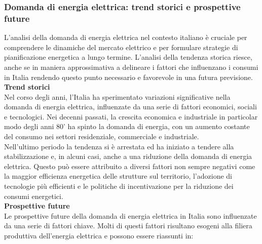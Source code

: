 \documentclass{article}
\begin{document}
\subsubsection{Domanda di energia elettrica: trend storici e prospettive future}
L'analisi della domanda di energia elettrica nel contesto italiano è cruciale per comprendere le dinamiche del mercato elettrico e per formulare strategie di pianificazione energetica a lungo termine. L’analisi della tendenza storica riesce, anche se in maniera approssimativa a delineare i fattori che influenzano i consumi in Italia rendendo questo punto necessario e favorevole in una futura previsione.\cite{GME2023}\\
\textbf{Trend storici}\\
Nel corso degli anni, l'Italia ha sperimentato variazioni significative nella domanda di energia elettrica, influenzate da una serie di fattori economici, sociali e tecnologici. Nei decenni passati, la crescita economica e industriale in particolar modo degli anni 80’ ha spinto la domanda di energia, con un aumento costante del consumo nei settori residenziale, commerciale e industriale.\cite{TernaConsumi2023}\cite{Terna2023}\\
Nell’ultimo periodo la tendenza si è arrestata ed ha iniziato a tendere alla stabilizzazione e, in alcuni casi, anche a una riduzione della domanda di energia elettrica. Questo può essere attribuito a diversi fattori non sempre negativi come la maggior efficienza energetica delle strutture sul territorio, l'adozione di tecnologie più efficienti e le politiche di incentivazione per la riduzione dei consumi energetici.\\
\textbf{Prospettive future}\\
Le prospettive future della domanda di energia elettrica in Italia sono influenzate da una serie di fattori chiave. Molti di questi fattori risultano esogeni alla filiera produttiva dell’energia elettrica e possono essere riassunti in:\cite{ISPRA2015}
\end{document}
